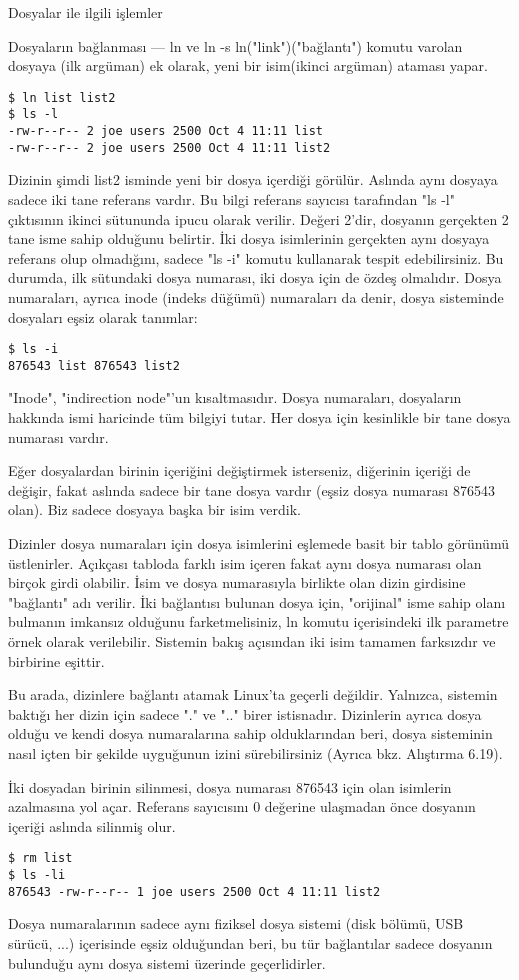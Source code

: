 \begin{section}{Dosyalar ile ilgili işlemler}
\begin{subsection}{Dosyaların bağlanması — ln ve ln -s}
ln("link")("bağlantı") komutu varolan dosyaya (ilk argüman) ek olarak, yeni bir isim(ikinci argüman) ataması yapar.
\begin{verbatim}
$ ln list list2
$ ls -l
-rw-r--r-- 2 joe users 2500 Oct 4 11:11 list
-rw-r--r-- 2 joe users 2500 Oct 4 11:11 list2
\end{verbatim}
Dizinin şimdi list2 isminde yeni bir dosya içerdiği görülür. Aslında aynı dosyaya sadece iki tane referans vardır. Bu bilgi referans sayıcısı tarafından "ls -l" çıktısının ikinci sütununda ipucu olarak verilir. Değeri 2'dir, dosyanın gerçekten 2 tane isme sahip olduğunu belirtir. İki dosya isimlerinin gerçekten aynı dosyaya referans olup olmadığını, sadece "ls -i" komutu kullanarak tespit edebilirsiniz. Bu durumda, ilk sütundaki dosya numarası, iki dosya için de özdeş olmalıdır. Dosya numaraları, ayrıca inode (indeks düğümü) numaraları da denir, dosya sisteminde dosyaları eşsiz olarak tanımlar:
\begin{verbatim}
$ ls -i
876543 list 876543 list2
\end{verbatim}
"Inode", "indirection node"'un kısaltmasıdır. Dosya numaraları, dosyaların hakkında ismi haricinde tüm bilgiyi tutar. Her dosya için kesinlikle bir tane dosya numarası vardır.

Eğer dosyalardan birinin içeriğini değiştirmek isterseniz, diğerinin içeriği de değişir, fakat aslında sadece bir tane dosya vardır (eşsiz dosya numarası 876543 olan). Biz sadece dosyaya başka bir isim verdik.

Dizinler dosya numaraları için dosya isimlerini eşlemede basit bir tablo görünümü üstlenirler. Açıkçası tabloda farklı isim içeren fakat aynı dosya numarası olan birçok girdi olabilir. İsim ve dosya numarasıyla birlikte olan dizin girdisine "bağlantı" adı verilir. İki bağlantısı bulunan dosya için, "orijinal" isme sahip olanı bulmanın imkansız olduğunu farketmelisiniz, ln komutu içerisindeki ilk parametre örnek olarak verilebilir. Sistemin bakış açısından iki isim tamamen farksızdır ve birbirine eşittir.

Bu arada, dizinlere bağlantı atamak Linux'ta geçerli değildir. Yalnızca, sistemin baktığı her dizin için  sadece "." ve ".." birer istisnadır. Dizinlerin ayrıca dosya olduğu ve kendi dosya numaralarına sahip olduklarından beri, dosya sisteminin nasıl içten bir şekilde uyguğunun izini sürebilirsiniz (Ayrıca bkz. Alıştırma 6.19).

İki dosyadan birinin silinmesi, dosya numarası 876543 için olan isimlerin azalmasına yol açar. Referans sayıcısını 0 değerine ulaşmadan önce dosyanın içeriği aslında silinmiş olur.
\begin{verbatim}
$ rm list
$ ls -li
876543 -rw-r--r-- 1 joe users 2500 Oct 4 11:11 list2
\end{verbatim}
Dosya numaralarının sadece aynı fiziksel dosya sistemi (disk bölümü, USB sürücü, ...) içerisinde eşsiz olduğundan beri, bu tür bağlantılar sadece dosyanın bulunduğu aynı dosya sistemi üzerinde geçerlidirler.


\end{subsection}
\end{section}
